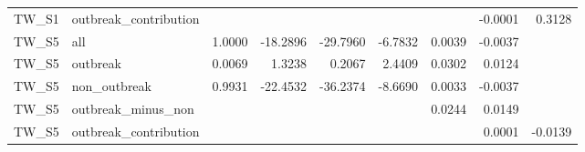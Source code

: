 \begin{tabular}{llrrrrrrr}
TW\_S1 & outbreak\_contribution &  &  &  &  &  & -0.0001 & 0.3128 \\
TW\_S5 & all & 1.0000 & -18.2896 & -29.7960 & -6.7832 & 0.0039 & -0.0037 &  \\
TW\_S5 & outbreak & 0.0069 & 1.3238 & 0.2067 & 2.4409 & 0.0302 & 0.0124 &  \\
TW\_S5 & non\_outbreak & 0.9931 & -22.4532 & -36.2374 & -8.6690 & 0.0033 & -0.0037 &  \\
TW\_S5 & outbreak\_minus\_non &  &  &  &  & 0.0244 & 0.0149 &  \\
TW\_S5 & outbreak\_contribution &  &  &  &  &  & 0.0001 & -0.0139 \\
\bottomrule
\end{tabular}
